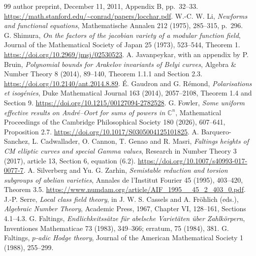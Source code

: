 \documentclass[11pt]{article}
\theoremstyle{definition}
\theoremstyle{remark}
\begin{document}
\begin{thebibliography}{99}
author preprint, December 11, 2011, Appendix B, pp.~32--33.
\url{https://math.stanford.edu/~conrad/papers/locchar.pdf}.
 W.-C. W. Li,
\emph{Newforms and functional equations}, Mathematische Annalen
212 (1975), 285--315, p.~296.
 G. Shimura,
\emph{On the factors of the jacobian variety of a modular function field},
Journal of the Mathematical Society of Japan 25 (1973), 523--544,
Theorem 1.
\url{https://doi.org/10.2969/jmsj/02530523}.
 A. Javanpeykar, with an appendix by P. Bruin,
\emph{Polynomial bounds for Arakelov invariants of Belyi curves},
Algebra \& Number Theory 8 (2014), 89--140,
Theorem 1.1.1 and Section 2.3.
\url{https://doi.org/10.2140/ant.2014.8.89}.
 \'E. Gaudron and G. R\'emond,
\emph{Polarisations et isog\'enies}, Duke Mathematical Journal
163 (2014), 2057--2108, Theorem 1.4 and Section 9.
\url{https://doi.org/10.1215/00127094-2782528}.
 G. Fowler, \emph{Some uniform effective results on
Andr\'e--Oort for sums of powers in $\mathbb C^n$}, Mathematical
Proceedings of the Cambridge Philosophical Society 180 (2026),
607--641, Proposition 2.7.
\url{https://doi.org/10.1017/S0305004125101825}.
 A. Barquero-Sanchez, L. Cadwallader, O. Cannon,
T. Genao and R. Masri, \emph{Faltings heights of CM elliptic curves
and special Gamma values}, Research in Number Theory 3 (2017),
article 13, Section 6, equation (6.2).
\url{https://doi.org/10.1007/s40993-017-0077-7}.
 A. Silverberg and Yu. G. Zarhin,
\emph{Semistable reduction and torsion subgroups of abelian varieties},
Annales de l'Institut Fourier 45 (1995), 403--420, Theorem 3.5.
\url{https://www.numdam.org/article/AIF_1995__45_2_403_0.pdf}.
 J.-P. Serre, \emph{Local class field theory},
in J. W. S. Cassels and A. Fr\"ohlich (eds.), \emph{Algebraic Number Theory},
Academic Press, 1967, Chapter VI, 128--161, Sections 4.1--4.3.
 G. Faltings, \emph{Endlichkeitss\"atze f\"ur
abelsche Variet\"aten \"uber Zahlk\"orpern}, Inventiones Mathematicae
73 (1983), 349--366; erratum, 75 (1984), 381.
 G. Faltings, \emph{$p$-adic Hodge theory},
Journal of the American Mathematical Society 1 (1988), 255--299.


\end{thebibliography}
\end{document}
